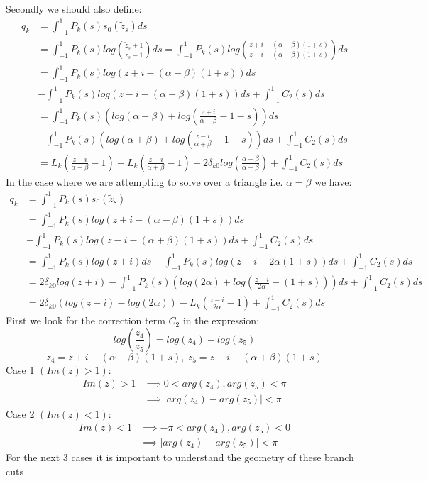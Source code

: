 \documentclass{article}
\begin{document}
Secondly we should also define:
\begin{align}
    q_k&=\int_{-1}^1P_k(s)s_0(\tilde{z}_s)ds\\
    &=\int_{-1}^1P_k(s)log(\frac{\tilde{z}_s+1}{\tilde{z}_s-1})ds
    =\int_{-1}^1P_k(s)log(\frac{z+i-(\alpha-\beta)(1+s)}{z-i-(\alpha+\beta)(1+s)})ds\\
    &=\int_{-1}^1P_k(s)log(z+i-(\alpha-\beta)(1+s))ds\\
    &-\int_{-1}^1P_k(s)log(z-i-(\alpha+\beta)(1+s))ds+\int_{-1}^1C_2(s)ds\\
    &=\int_{-1}^1P_k(s)(log(\alpha-\beta)+log(\frac{z+i}{\alpha-\beta}-1-s))ds\\
    &-\int_{-1}^1P_k(s)(log(\alpha+\beta)+log(\frac{z-i}{\alpha+\beta}-1-s))ds+\int_{-1}^1C_2(s)ds\\
    &=L_k(\frac{z-i}{\alpha-\beta}-1)-L_k(\frac{z-i}{\alpha+\beta}-1)
    +2\delta_{k0}log(\frac{\alpha-\beta}{\alpha+\beta})+\int_{-1}^1C_2(s)ds
\end{align}
In the case where we are attempting to solve over a triangle i.e. $\alpha=\beta$ we have:
\begin{align}
    q_k&=\int_{-1}^1P_k(s)s_0(\tilde{z}_s)\\
    &=\int_{-1}^1P_k(s)log(z+i-(\alpha-\beta)(1+s))ds\\
    &-\int_{-1}^1P_k(s)log(z-i-(\alpha+\beta)(1+s))ds+\int_{-1}^1C_2(s)ds\\
    &=\int_{-1}^1P_k(s)log(z+i)ds-\int_{-1}^1P_k(s)log(z-i-2\alpha(1+s))ds+\int_{-1}^1C_2(s)ds\\
    &=2\delta_{k0}log(z+i)-\int_{-1}^1P_k(s)(log(2\alpha)+log(\frac{z-i}{2\alpha}-(1+s)))ds+\int_{-1}^1C_2(s)ds\\
    &=2\delta_{k0}(log(z+i)-log(2\alpha))-L_k(\frac{z-i}{2\alpha}-1)+\int_{-1}^1C_2(s)ds
\end{align}
First we look for the correction term $C_2$ in the expression:
$$log(\frac{z_4}{z_5})=log(z_4)-log(z_5)$$
$$z_4=z+i-(\alpha-\beta)(1+s),\:z_5=z-i-(\alpha+\beta)(1+s)$$
Case 1 $(Im(z)>1)$:
\begin{align}
    Im(z)>1 &\implies 0<arg(z_4),arg(z_5)<\pi\\
    &\implies |arg(z_4)-arg(z_5)|<\pi
\end{align}
Case 2 $(Im(z)<1)$:
\begin{align}
    Im(z)<1 &\implies -\pi<arg(z_4),arg(z_5)<0\\
    &\implies |arg(z_4)-arg(z_5)|<\pi
\end{align}
For the next 3 cases it is important to understand the geometry of these branch cuts
\end{document}
